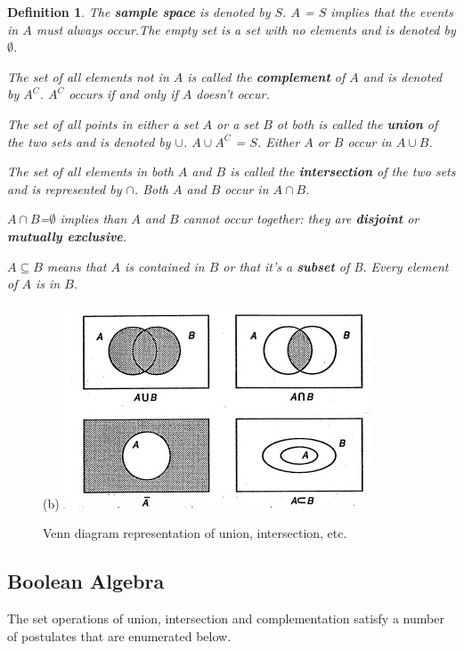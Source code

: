 \documentclass{article}
\newtheorem{definition}{Definition}[section]
\begin{document}
\begin{definition}
The \textbf{sample space} is denoted by $S$. \( A \) =  \( S \) implies that the events in \( A \) must always occur.The empty set is a set with no elements and is denoted by $\emptyset$.

The set of all elements not in \( A \) is called the \textbf{complement} of \( A \) and is denoted by \( A^{C} \). \( A^{C} \) occurs if and only if \( A\) doesn't occur.

The set of all points in either a set \(A\) or a set \(B\) ot both is called the \textbf{union} of the two sets and is denoted by \(\cup\). \(A \cup A^C\) = \(S\). Either \(A\) or \(B\) occur in \(A\cup B\).

The set of all elements in both \(A\) and \(B\) is called the \textbf{intersection} of the two sets and is represented by \(\cap\). Both \(A\) and \(B\) occur in \(A\cap B\).

\(A\cap B\)=$\emptyset$ implies than \(A\) and \(B\) cannot occur together: they are \textbf{disjoint} or \textbf{mutually exclusive}.

\(A\subseteq B\) means that \(A\) is contained in \(B\) or that it's a \textbf{subset} of B. Every element of \(A\) is in \(B\).

\end{definition}

\begin{figure}(b)
    \centering
    \includegraphics{pics/venn sets.jpg}
    \caption{Venn diagram representation of union, intersection, etc.}
\end{figure}

\subsection{Boolean Algebra}

The set operations of union, intersection and complementation satisfy a number of postulates that are enumerated below.
\end{document}
